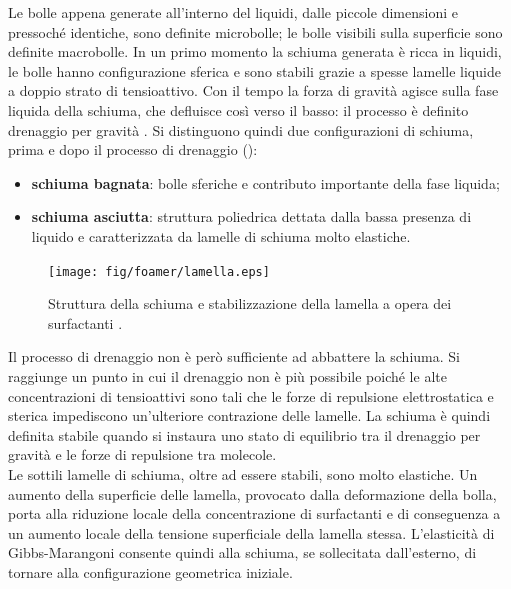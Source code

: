 Le bolle appena generate all'interno del liquidi, dalle piccole dimensioni e pressoché identiche, sono definite microbolle; le bolle visibili sulla superficie sono definite macrobolle. In un primo momento la schiuma generata è ricca in liquidi, le bolle hanno configurazione sferica e sono stabili grazie a spesse lamelle liquide a doppio strato di tensioattivo. Con il tempo la forza di gravità agisce sulla fase liquida della schiuma, che defluisce così verso il basso: il processo è definito drenaggio per gravità \parencite{tego2014brochure}. Si distinguono quindi due configurazioni di schiuma, prima e dopo il processo di drenaggio ():
\begin{itemize}
    \item \textbf{schiuma bagnata}: bolle sferiche e contributo importante della fase liquida;
    \item \textbf{schiuma asciutta}: struttura poliedrica dettata dalla bassa presenza di liquido e caratterizzata da lamelle di schiuma molto elastiche.
\end{itemize}

\begin{figure}[htbp]
    \centering
    \texttt{[image: fig/foamer/lamella.eps]}
    \caption{Struttura della schiuma e stabilizzazione della lamella a opera dei surfactanti \parencite{tego2014brochure}.}
    \label{fig:lamella}
\end{figure}

Il processo di drenaggio non è però sufficiente ad abbattere la schiuma. Si raggiunge un punto in cui il drenaggio non è più possibile poiché le alte concentrazioni di tensioattivi sono tali che le forze di repulsione elettrostatica e sterica impediscono un'ulteriore contrazione delle lamelle. La schiuma è quindi definita stabile quando si instaura uno stato di equilibrio tra il drenaggio per gravità e le forze di repulsione tra molecole.\\
Le sottili lamelle di schiuma, oltre ad essere stabili, sono molto elastiche. Un aumento della superficie delle lamella, provocato dalla deformazione della bolla, porta alla riduzione locale della concentrazione di surfactanti e di conseguenza a un aumento locale della tensione superficiale della lamella stessa. L'elasticità di Gibbs-Marangoni consente quindi alla schiuma, se sollecitata dall'esterno, di tornare alla configurazione geometrica iniziale.

